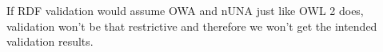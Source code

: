 \documentclass[a4paper,fontsize=11pt]{scrartcl}
\newcommand{\tb}[1]{\todo[size=\small, color=green!40]{\textbf{Thomas:} #1}}
\newcommand{\ms}[1]{\texttt{#1}}
\begin{document}
If RDF validation would assume OWA and nUNA just like OWL 2 does, validation won’t be that restrictive and therefore we won’t get the intended validation results.
%
\end{document}
